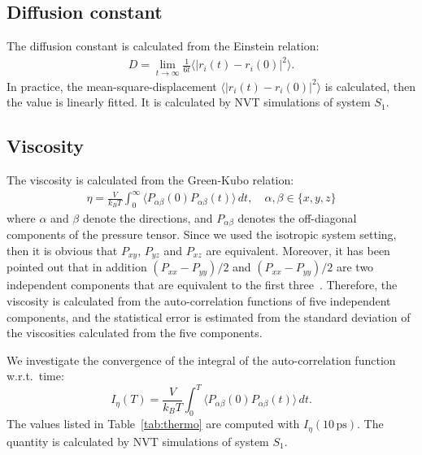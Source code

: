 \documentclass[a4paper,preprint,unsortedaddress,onecolumn,fleqn]{revtex4}
\begin{document}
\subsection{Diffusion constant}

The diffusion constant is calculated from the Einstein relation: 
\begin{align}
D = \lim_{t\rightarrow \infty}\frac {1}{6t} \langle \vert \mathbf{\mathit{r}}%
_i(t) - \mathbf{\mathit{r}}_i(0)\vert^2\rangle.
\end{align}
In practice, the mean-square-displacement $\langle\vert \mathbf{\mathit{r}}%
_i(t) - \mathbf{\mathit{r}}_i(0)\vert^2\rangle$ is calculated, then the
value is linearly fitted. It is calculated by NVT simulations of system $S_1$.

\subsection{Viscosity}

The viscosity is calculated from the Green-Kubo relation: 
\begin{align}
\eta = \frac{V}{k_BT}\int_0^\infty\langle P_{\alpha\beta}(0)
P_{\alpha\beta}(t)\rangle\,dt, \quad \alpha,\beta \in \{x, y, z\}
\end{align}
where $\alpha$ and $\beta$ denote the directions, and $P_{\alpha\beta}$
denotes the off-diagonal components of the pressure tensor. Since we used
the isotropic system setting, then it is obvious that $P_{xy}$, $P_{yz}$ and 
$P_{xz}$ are equivalent. Moreover, it has been pointed out that in addition $%
(P_{xx} - P_{yy})/2$ and $(P_{xx} - P_{yy})/2$ are two independent
components that are equivalent to the first three~\cite{alfe1998first}.
Therefore, the viscosity is calculated from the auto-correlation functions
of five independent components, and the statistical error is estimated from
the standard deviation of the viscosities calculated from the five
components.

We investigate the convergence of the integral of the auto-correlation
function w.r.t.~time: 
\begin{equation*}
I_{\eta }(T)=\frac{V}{k_{B}T}\int_{0}^{T}\langle P_{\alpha \beta
}(0)P_{\alpha \beta }(t)\rangle \,dt.
\end{equation*}%
The values listed in Table~\ref{tab:thermo} are computed with $I_{\eta }(10\,%
\text{ps})$. The quantity is calculated by NVT simulations of system $S_{1}$.

\newpage

% 


{}
\end{document}

